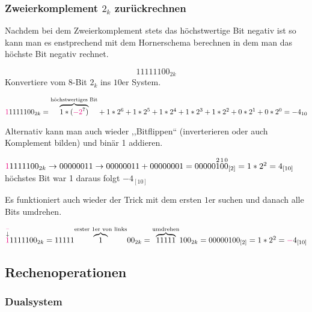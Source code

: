 \documentclass{article}
\begin{document}
\subsubsection{Zweierkomplement $2_k$ zurückrechnen}

Nachdem bei dem Zweierkomplement stets das höchstwertige Bit negativ ist so kann man es enstprechend mit dem Hornerschema berechnen in dem man das höchste Bit negativ rechnet.


\begin{question}[]
    \begin{equation*}
        11111100_{2k}
    \end{equation*}
    Konvertiere vom 8-Bit $2_k$ ins $10$er System.
\end{question}

\begin{answer}[]
    $\textcolor{RubineRed}{1}1111100_{2k}=\overset{\text{höchstwertiges Bit}}{\overbrace{1*(\textcolor{RubineRed}{-2}^7)}} + 1*2^6 + 1*2^5 + 1*2^4 + 1*2^3 + 1*2^2 + 0*2^1 + 0*2^0=-4_{10}$
\end{answer}

Alternativ kann man auch wieder ,,Bitflippen`` (inverterieren oder auch Komplement bilden) und binär 1 addieren.

\begin{answer}[]
    $\textcolor{RubineRed}{1}1111100_{2k} \rightarrow 00000011 \rightarrow 00000011 + 00000001 = 00000\overset{2}{1}\overset{1}{0}\overset{0}{0}_{[2]} = 1*2^2 = 4_{[10]}$ \\
    höchstes Bit war 1 daraus folgt $-4_{[10]}$
\end{answer}



Es funktioniert auch wieder der Trick mit dem ersten $1$er suchen und danach alle Bits umdrehen.

\begin{answer}[]
    $\overset{\overset{\textcolor{RubineRed}{-}}{\downarrow}}{\textcolor{RubineRed}{1}}1111100_{2k}=11111\overset{\text{erster 1er von links}}{\overbrace{1}}00_{2k}=\overset{\text{umdrehen}}{\overbrace{11111}}100_{2k}=00000100_{[2]}=1*2^2 = \textcolor{RubineRed}{-}4_{[10]}$
\end{answer}

\subsection{Rechenoperationen}

\subsubsection{Dualsystem}
\end{document}
